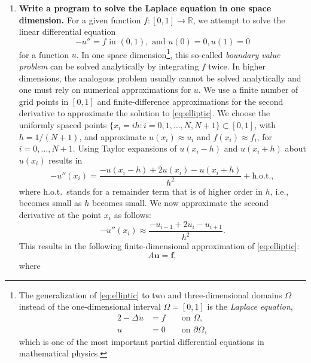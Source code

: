 \documentclass[11pt]{article}
\newcommand{\bs}{\boldsymbol}
\begin{document}
\begin{enumerate}
  

\item {\bf Write a program to solve the Laplace equation in one space
  dimension.} For a given function $f:[0,1]\to\mathbb R$, we attempt to
  solve the linear differential equation
  \begin{equation}\label{eq:elliptic}
    -u'' = f \text { in } (0,1), \text{ and } u(0) = 0, u(1) =
    0
  \end{equation}
  for a function $u$. In one space dimension\footnote{The
    generalization of \eqref{eq:elliptic} to two and three-dimensional
    domains $\Omega$ instead of the one-dimensional interval $\Omega =
    [0,1]$ is the \emph{Laplace equation},
    \begin{alignat*}{2}
      -\Delta u &= f && \text{ on } \Omega,\\
      u&=0&& \text{ on } \partial\Omega,
    \end{alignat*}
    which is one of the most important partial differential equations
    in mathematical physics.}, this so-called \emph{boundary value
    problem} can be solved analytically by integrating $f$ twice. In
  higher dimensions, the analogous problem usually cannot be solved
  analytically and one must rely on numerical approximations for $u$.
  We use  a finite number of grid points in $[0,1]$ and
  finite-difference approximations for the second derivative to
  approximate the solution to \eqref{eq:elliptic}. We choose the
  uniformly spaced points $\{x_i=ih:i=0,1,\ldots,N,N+1\}\subset
  [0,1]$, with $h = 1/(N+1)$, and approximate $u(x_i)\approx u_i$ and
  $f(x_i)\approx f_i$, for $i=0,\ldots, N+1$. Using Taylor expansions
  of $u(x_i-h)$ and $u(x_i+h)$ about $u(x_i)$ results in
  \begin{equation*}%
    -u''(x_i) = \frac{-u(x_i-h) + 2u(x_i) - u(x_i+h)}{h^2} + \text{h.o.t.},
  \end{equation*}
  where h.o.t.\ stands for a remainder term that is of higher order in
  $h$, i.e., becomes small as $h$ becomes small.
  We now approximate the second derivative
  at the point $x_i$ as follows:
  \begin{equation*}%
    -u''(x_i)  \approx  \frac{-u_{i-1} + 2u_i - u_{i+1}}{h^2}.
  \end{equation*}
  This results in the following
  finite-dimensional approximation of \eqref{eq:elliptic}:
  \begin{equation}\label{eq:Au=f}
    A\bs u = \bs f,
  \end{equation}
  where
  \begin{equation*}

\end{equation*}
\end{enumerate}
\end{document}
